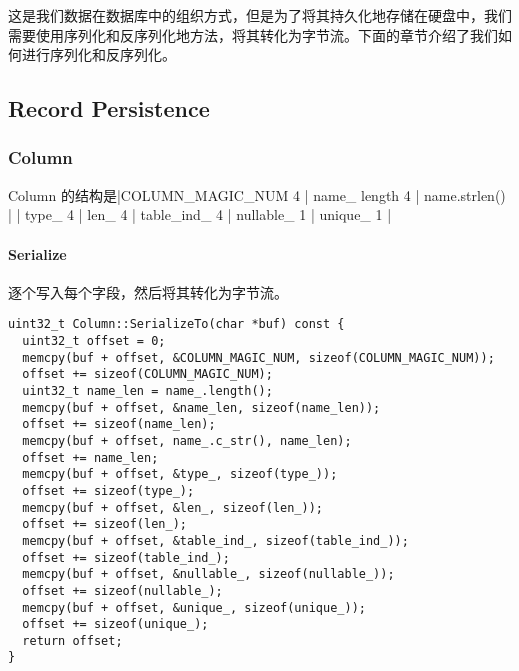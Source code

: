\documentclass[12pt,hyperref,a4paper,UTF8]{ctexart}
\begin{document}
这是我们数据在数据库中的组织方式，但是为了将其持久化地存储在硬盘中，我们需要使用序列化和反序列化地方法，将其转化为字节流。下面的章节介绍了我们如何进行序列化和反序列化。

\subsection{Record Persistence}

\subsubsection{Column}

Column 的结构是|COLUMN\_MAGIC\_NUM 4 | name\_ length 4 | name.strlen() | | type\_ 4 | len\_ 4 | table\_ind\_ 4 | nullable\_ 1 | unique\_ 1 |

\paragraph{Serialize}
逐个写入每个字段，然后将其转化为字节流。
\begin{verbatim}
uint32_t Column::SerializeTo(char *buf) const {
  uint32_t offset = 0;
  memcpy(buf + offset, &COLUMN_MAGIC_NUM, sizeof(COLUMN_MAGIC_NUM));
  offset += sizeof(COLUMN_MAGIC_NUM);
  uint32_t name_len = name_.length();
  memcpy(buf + offset, &name_len, sizeof(name_len));
  offset += sizeof(name_len);
  memcpy(buf + offset, name_.c_str(), name_len);
  offset += name_len;
  memcpy(buf + offset, &type_, sizeof(type_));
  offset += sizeof(type_);
  memcpy(buf + offset, &len_, sizeof(len_));
  offset += sizeof(len_);
  memcpy(buf + offset, &table_ind_, sizeof(table_ind_));
  offset += sizeof(table_ind_);
  memcpy(buf + offset, &nullable_, sizeof(nullable_));
  offset += sizeof(nullable_);
  memcpy(buf + offset, &unique_, sizeof(unique_));
  offset += sizeof(unique_);
  return offset;
}
\end{verbatim}
\end{document}
